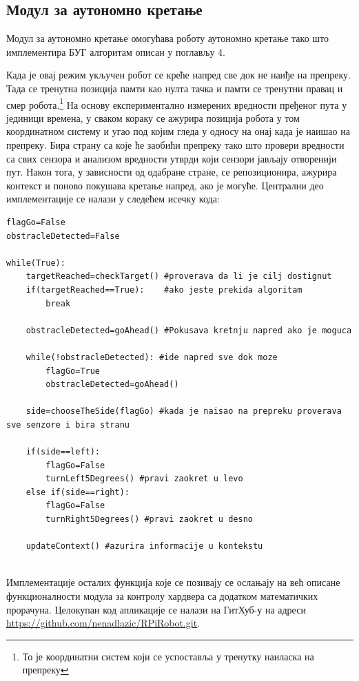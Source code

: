 \documentclass[12pt,oneside]{memoir}
\theoremstyle{remark}
\begin{document}
\subsection{Модул за аутономно кретање}
Модул за аутономно кретање омогућава роботу аутономно кретање тако што имплементира БУГ алгоритам описан у поглављу 4.

Када је овај режим укључен робот се креће напред све док не наиђе на препреку. Тада се тренутна позиција памти као нулта тачка и памти се тренутни правац и смер робота.\footnote{То је координатни систем који се успоставља у тренутку наиласка на препреку} 
На основу експериментално измерених вредности пређеног пута у јединици времена, у сваком кораку се ажурира позиција робота у том координатном систему и угао под којим гледа у односу на онај када је наишао на препреку. Бира страну са које ће заобићи препреку тако што провери вредности са свих сензора и анализом вредности утврди који сензори јављају отворенији пут. Након тога, у зависности од одабране стране, се репозиционира, ажурира контекст и поново покушава кретање напред, ако је могуће. Централни део имплементације се налази у следећем исечку кода:

\begin{lstlisting}
flagGo=False
obstracleDetected=False

while(True):
	targetReached=checkTarget() #proverava da li je cilj dostignut
	if(targetReached==True):	#ako jeste prekida algoritam
		break

	obstracleDetected=goAhead()	#Pokusava kretnju napred ako je moguca

	while(!obstracleDetected): #ide napred sve dok moze
		flagGo=True
		obstracleDetected=goAhead()

	side=chooseTheSide(flagGo) #kada je naisao na prepreku proverava sve senzore i bira stranu

	if(side==left):
		flagGo=False
		turnLeft5Degrees() #pravi zaokret u levo 
	else if(side==right):
		flagGo=False
		turnRight5Degrees() #pravi zaokret u desno
	
	updateContext() #azurira informacije u kontekstu
	
\end{lstlisting}

Имплементације осталих функција које се позивају се ослањају на већ описане функционалности модула за контролу хардвера са додатком математичких прорачуна. Целокупан код апликације се налази на ГитХуб-у на адреси \url{https://github.com/nenadlazic/RPiRobot.git}.
\end{document}
